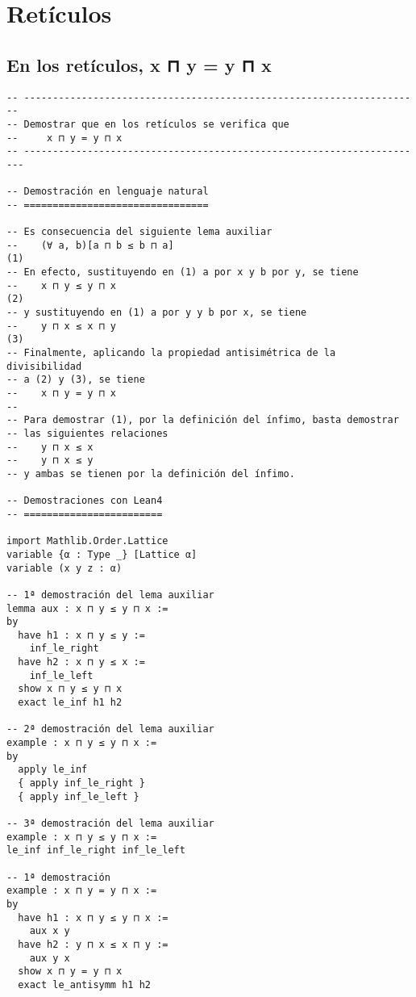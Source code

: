\chapter{Retículos}
\label{sec:org79c3547}

\section{En los retículos, x ⊓ y = y ⊓ x}
\label{sec:org5c722ff}
\begin{verbatim}
-- ---------------------------------------------------------------------
-- Demostrar que en los retículos se verifica que
--     x ⊓ y = y ⊓ x
-- ----------------------------------------------------------------------

-- Demostración en lenguaje natural
-- ================================

-- Es consecuencia del siguiente lema auxiliar
--    (∀ a, b)[a ⊓ b ≤ b ⊓ a]                                         (1)
-- En efecto, sustituyendo en (1) a por x y b por y, se tiene
--    x ⊓ y ≤ y ⊓ x                                                   (2)
-- y sustituyendo en (1) a por y y b por x, se tiene
--    y ⊓ x ≤ x ⊓ y                                                   (3)
-- Finalmente, aplicando la propiedad antisimétrica de la divisibilidad
-- a (2) y (3), se tiene
--    x ⊓ y = y ⊓ x
--
-- Para demostrar (1), por la definición del ínfimo, basta demostrar
-- las siguientes relaciones
--    y ⊓ x ≤ x
--    y ⊓ x ≤ y
-- y ambas se tienen por la definición del ínfimo.

-- Demostraciones con Lean4
-- ========================

import Mathlib.Order.Lattice
variable {α : Type _} [Lattice α]
variable (x y z : α)

-- 1ª demostración del lema auxiliar
lemma aux : x ⊓ y ≤ y ⊓ x :=
by
  have h1 : x ⊓ y ≤ y :=
    inf_le_right
  have h2 : x ⊓ y ≤ x :=
    inf_le_left
  show x ⊓ y ≤ y ⊓ x
  exact le_inf h1 h2

-- 2ª demostración del lema auxiliar
example : x ⊓ y ≤ y ⊓ x :=
by
  apply le_inf
  { apply inf_le_right }
  { apply inf_le_left }

-- 3ª demostración del lema auxiliar
example : x ⊓ y ≤ y ⊓ x :=
le_inf inf_le_right inf_le_left

-- 1ª demostración
example : x ⊓ y = y ⊓ x :=
by
  have h1 : x ⊓ y ≤ y ⊓ x :=
    aux x y
  have h2 : y ⊓ x ≤ x ⊓ y :=
    aux y x
  show x ⊓ y = y ⊓ x
  exact le_antisymm h1 h2


\end{verbatim}
